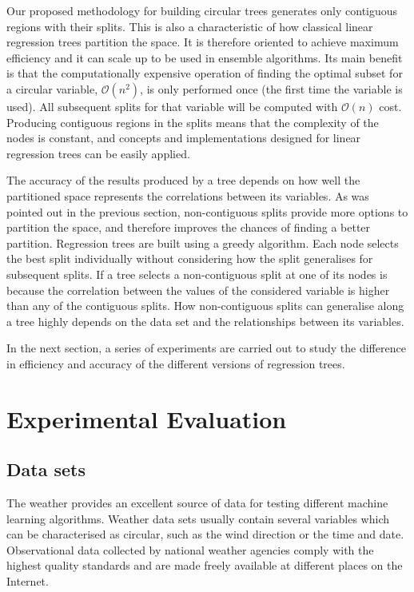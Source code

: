 \documentclass[times,twocolumn,final,authoryear]{elsarticle}
\begin{document}
Our proposed methodology for building circular trees generates only contiguous regions with their splits. This is also a characteristic of how classical linear regression trees partition the space. It is therefore oriented to achieve maximum efficiency and it can scale up to be used in ensemble algorithms. Its main benefit is that the computationally expensive operation of finding the optimal subset for a circular variable, $\mathcal{O}(n^2)$, is only performed once (the first time the variable is used). All subsequent splits for that variable will be computed with $\mathcal{O}(n)$ cost. Producing contiguous regions in the splits means that the complexity of the nodes is constant, and concepts and implementations designed for linear regression trees can be easily applied.

The accuracy of the results produced by a tree depends on how well the partitioned space represents the correlations between its variables. As was pointed out in the previous section, non-contiguous splits provide more options to partition the space, and therefore improves the chances of finding a better partition. Regression trees are built using a greedy algorithm. Each node selects the best split individually without considering how the split generalises for subsequent splits. If a tree selects a non-contiguous split at one of its nodes is because the correlation between the values of the considered variable is higher than any of the contiguous splits. How non-contiguous splits can generalise along a tree highly depends on the data set and the relationships between its variables.

In the next section, a series of experiments are carried out to study the difference in efficiency and accuracy of the different versions of regression trees.


\section{Experimental Evaluation}

\subsection{Data sets}

The weather provides an excellent source of data for testing different machine learning algorithms. Weather data sets usually contain several variables which can be characterised as circular, such as the wind direction or the time and date. Observational data collected by national weather agencies comply with the highest quality standards and are made freely available at different places on the Internet.
\end{document}
